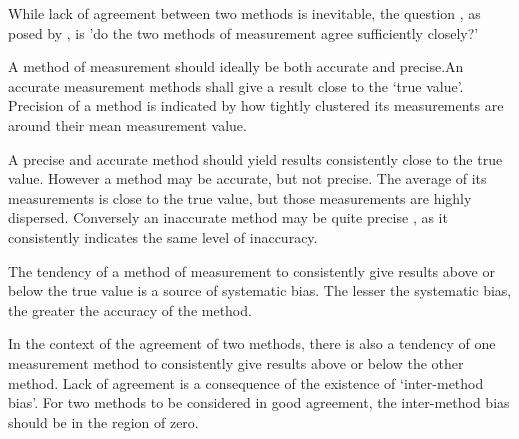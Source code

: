 \documentclass[12pt, a4paper]{report}
\theoremstyle{plain}
\theoremstyle{definition}
\theoremstyle{remark}
\begin{document}
	While lack of agreement between two methods is inevitable, the question , as
	posed by \citet{BA83}, is 'do the two methods of measurement agree
	sufficiently closely?'
	
	A method of measurement should ideally be both accurate and
	precise.An accurate measurement methods shall give a result close
	to the `true value'. Precision of a method is indicated by how
	tightly clustered its measurements are around their mean
	measurement value.
	

	
	A precise and accurate method should yield results consistently
	close to the true value. However a method may be accurate, but not
	precise. The average of its measurements is close to the true
	value, but those measurements are highly dispersed. Conversely an
	inaccurate method may be quite precise , as it consistently
	indicates the same level of inaccuracy.
	
	The tendency of a method of measurement to consistently give
	results above or below the true value is a source of systematic
	bias. The lesser the systematic bias, the greater the accuracy of
	the method.
	
	In the context of the agreement of two methods, there is also a
	tendency of one measurement method to consistently give results
	above or below the other method. Lack of agreement is a
	consequence of the existence of `inter-method bias'. For two
	methods to be considered in good agreement, the inter-method bias
	should be in the region of zero.
	
\end{document}
